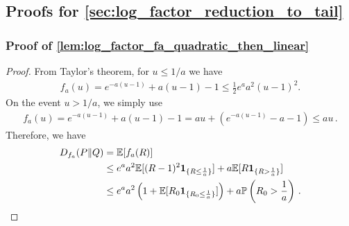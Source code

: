 \documentclass{article}
\theoremstyle{plain}
\theoremstyle{definition}
\theoremstyle{plain}
\newcommand{\E}{\mathbb E}
\newcommand{\PP}{\mathbb P}
\begin{document}
\subsection{Proofs for \cref{sec:log_factor_reduction_to_tail}}
\subsubsection{Proof of \cref{lem:log_factor_fa_quadratic_then_linear}}
\label{proof:log_factor_fa_quadratic_then_linear}
\begin{proof}
    From Taylor's theorem, for $u\le 1/a$ we have
    \begin{align}
        f_a(u)
        =
        e^{-a(u-1)}+a(u-1)-1
        \le
        \frac12 e^a a^2 (u-1)^2.
    \end{align}
    On the event $u>1/a$, we simply use
    \begin{align}
        f_a(u)
        =
        e^{-a(u-1)}+a(u-1)-1
        =
        au
        +
        (e^{-a(u-1)}-a-1)
        \le
        au\,.
    \end{align}
    Therefore, we have
    \begin{align}
        D_{f_a}(P\|Q)
         & =
        \E[f_a(R)]
        \\
         & \le
        e^a a^2 \E[(R-1)^2\mathbf{1}_{\{R\le \frac{1}{a}\}}]
        +
        a \E[R\mathbf{1}_{\{R>\frac{1}{a}\}}]
        \\
         & \le
        e^a
        a^2
        \left(
        1+\E[R_0\mathbf{1}_{\{R_0\le \frac{1}{a}\}}]
        \right)
        +
        a \PP\left(R_0>\frac{1}{a}\right)\,.
        \qedhere
    \end{align}
\end{proof}
\end{document}

